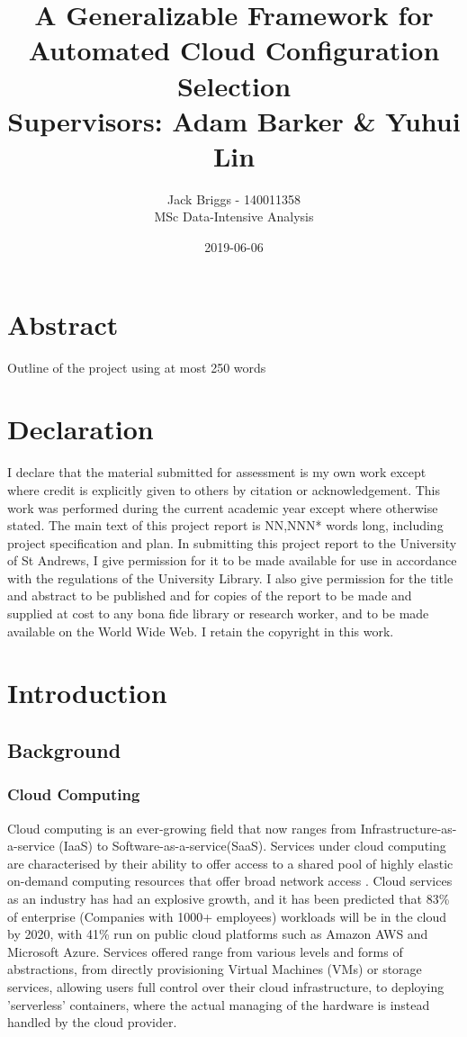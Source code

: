 \documentclass{report}
\title{\vspace{-2.0cm} A Generalizable Framework for Automated Cloud Configuration Selection \\ \vspace{0.5cm} \large Supervisors: Adam Barker \& Yuhui Lin}
\date{2019-06-06}
\author{Jack Briggs - 140011358 \\ MSc Data-Intensive Analysis}
\begin{document}
\maketitle
\newpage
\chapter*{Abstract}
Outline of the project using at most 250 words
\newpage
\chapter*{Declaration}
I declare that the material submitted for assessment
is my own work except where credit is explicitly
given to others by citation or acknowledgement. This
work was performed during the current academic year
except where otherwise stated.
The main text of this project report is NN,NNN* words
long, including project specification and plan.
In submitting this project report to the University of St
Andrews, I give permission for it to be made
available for use in accordance with the regulations of the University Library. I also give permission for the title and abstract to be published and for copies of the report to be made and supplied at cost to any bona fide library or research worker, and to be made available on the World Wide Web. I retain the copyright in this work.
\newpage
\tableofcontents
\listoffigures
\newpage
{}
\chapter{Introduction}
\section{Background}
\subsection{Cloud Computing}
Cloud computing is an ever-growing field that now ranges from Infrastructure-as-a-service (IaaS) to Software-as-a-service(SaaS). Services under cloud computing are characterised by their ability to offer access to a shared pool of highly elastic on-demand computing resources that offer broad network access \cite{Pallis2010, Mell2011}. Cloud services as an industry has had an explosive growth, and it has been predicted that 83\% of enterprise (Companies with 1000+ employees) workloads will be in the cloud by 2020\cite{Intricately2019}, with 41\% run on public cloud platforms such as Amazon AWS and Microsoft Azure. Services offered range from various levels and forms of abstractions, from directly provisioning Virtual Machines (VMs) or storage services, allowing users full control over their cloud infrastructure, to deploying 'serverless' containers, where the actual managing of the hardware is instead handled by the cloud provider.
\end{document}
